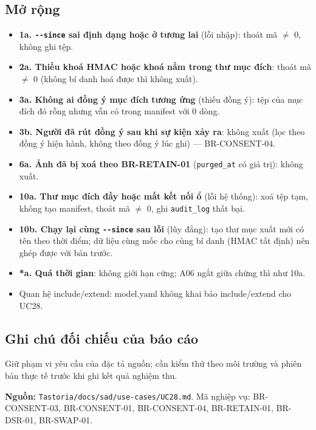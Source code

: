 \subsection{Mở rộng}
\begin{itemize}
\item \textbf{1a. {\small\texttt{-\allowbreak{}-\allowbreak{}since}} sai định dạng hoặc ở tương lai} (lỗi nhập): thoát mã \ensuremath{\neq} 0, không ghi tệp.
\item \textbf{2a. Thiếu khoá HMAC hoặc khoá nằm trong thư mục đích}: thoát mã \ensuremath{\neq} 0 (không bí danh hoá được thì không xuất).
\item \textbf{3a. Không ai đồng ý mục đích tương ứng} (thiếu đồng ý): tệp của mục đích đó rỗng nhưng vẫn có trong manifest với 0 dòng.
\item \textbf{3b. Người đã rút đồng ý sau khi sự kiện xảy ra}: không xuất (lọc theo đồng ý hiện hành, không theo đồng ý lúc ghi) --- BR-\allowbreak{}CONSENT-\allowbreak{}04.
\item \textbf{6a. Ảnh đã bị xoá theo BR-\allowbreak{}RETAIN-\allowbreak{}01} ({\small\texttt{purged\_\allowbreak{}\allowbreak{}at}} có giá trị): không xuất.
\item \textbf{10a. Thư mục đích đầy hoặc mất kết nối ổ} (lỗi hệ thống): xoá tệp tạm, không tạo manifest, thoát mã \ensuremath{\neq} 0, ghi {\small\texttt{audit\_\allowbreak{}\allowbreak{}log}} thất bại.
\item \textbf{10b. Chạy lại cùng {\small\texttt{-\allowbreak{}-\allowbreak{}since}} sau lỗi} (lũy đẳng): tạo thư mục xuất mới có tên theo thời điểm; dữ liệu cùng mốc cho cùng bí danh (HMAC tất định) nên ghép được với bản trước.
\item \textbf{*a. Quá thời gian}: không giới hạn cứng; A06 ngắt giữa chừng thì như 10a.
\item Quan hệ include/\allowbreak{}extend: model.yaml không khai báo include/\allowbreak{}extend cho UC28.
\end{itemize}
\subsection{Ghi chú đối chiếu của báo cáo}
Giữ phạm vi yêu cầu của đặc tả nguồn; cần kiểm thử theo môi trường và phiên bản thực tế trước khi ghi kết quả nghiệm thu.

\textbf{Nguồn:} {\small\texttt{Tastoria/\allowbreak{}\allowbreak{}docs/\allowbreak{}\allowbreak{}sad/\allowbreak{}\allowbreak{}use-\allowbreak{}cases/\allowbreak{}\allowbreak{}UC28.\allowbreak{}md}}. Mã nghiệp vụ: BR-\allowbreak{}CONSENT-\allowbreak{}03, BR-\allowbreak{}CONSENT-\allowbreak{}01, BR-\allowbreak{}CONSENT-\allowbreak{}04, BR-\allowbreak{}RETAIN-\allowbreak{}01, BR-\allowbreak{}DSR-\allowbreak{}01, BR-\allowbreak{}SWAP-\allowbreak{}01.

